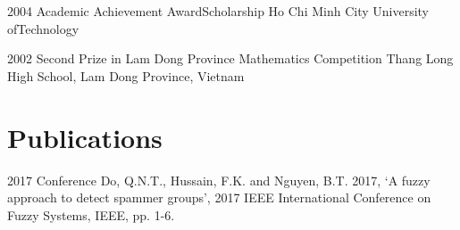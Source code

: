\documentclass{tccv}
\begin{document}
\begin{yearlist}

\item{2004}
    {Academic Achievement Award\newline Scholarship}
    {Ho Chi Minh City University of\newline Technology}

\item{2002}
    {Second Prize in Lam Dong Province Mathematics Competition}
    {Thang Long High School, Lam Dong Province, Vietnam}

\end{yearlist}

\section{Publications}

\begin{yearlist}
\item{2017}
    {Conference}
    {Do, Q.N.T., Hussain, F.K. and Nguyen, B.T. 2017, ‘A fuzzy approach to
        detect spammer groups’, 2017 IEEE International Conference on Fuzzy
    Systems, IEEE, pp. 1-6.}
\end{yearlist}
\end{document}
